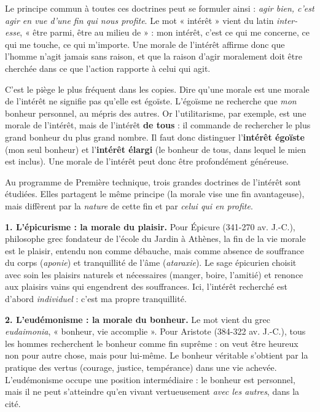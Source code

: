 \documentclass[11pt]{article}
\newcommand{\cle}[1]{{\popxbold\color{popdark}#1}}
\newcounter{popsec}
\newcounter{popsub}
\newcommand{\courssub}[1]{%
  \stepcounter{popsub}%
  \par\vspace{9pt}\noindent{\popxbold\fontsize{11.5}{13}\selectfont\color{popink}{\color{poporange}\thepopsec.\thepopsub}\hspace{6pt}#1}\par\nopagebreak\vspace{4pt}
}
\begin{document}
Le principe commun à toutes ces doctrines peut se formuler ainsi : \emph{agir bien, c'est agir en vue d'une fin qui nous profite}. Le mot « intérêt » vient du latin \emph{inter-esse}, « être parmi, être au milieu de » : mon intérêt, c'est ce qui me concerne, ce qui me touche, ce qui m'importe. Une morale de l'intérêt affirme donc que l'homme n'agit jamais sans raison, et que la raison d'agir moralement doit être cherchée dans ce que l'action rapporte à celui qui agit.

\begin{attention}
C'est le piège le plus fréquent dans les copies. Dire qu'une morale est une morale de l'\cle{intérêt} ne signifie pas qu'elle est \cle{égoïste}. L'égoïsme ne recherche que \emph{mon} bonheur personnel, au mépris des autres. Or l'utilitarisme, par exemple, est une morale de l'intérêt, mais de l'intérêt \textbf{de tous} : il commande de rechercher le plus grand bonheur du plus grand nombre. Il faut donc distinguer l'\textbf{intérêt égoïste} (mon seul bonheur) et l'\textbf{intérêt élargi} (le bonheur de tous, dans lequel le mien est inclus). Une morale de l'intérêt peut donc être profondément généreuse.
\end{attention}

\courssub{Les trois formes de la morale de l'intérêt}

Au programme de Première technique, trois grandes doctrines de l'intérêt sont étudiées. Elles partagent le même principe (la morale vise une fin avantageuse), mais diffèrent par la \emph{nature} de cette fin et par \emph{celui qui en profite}.

\textbf{1. L'épicurisme : la morale du plaisir.} Pour Épicure (341-270 av. J.-C.), philosophe grec fondateur de l'école du Jardin à Athènes, la fin de la vie morale est le \cle{plaisir}, entendu non comme débauche, mais comme absence de souffrance du corps (\emph{aponie}) et tranquillité de l'âme (\emph{ataraxie}). Le sage épicurien choisit avec soin les plaisirs naturels et nécessaires (manger, boire, l'amitié) et renonce aux plaisirs vains qui engendrent des souffrances. Ici, l'intérêt recherché est d'abord \emph{individuel} : c'est ma propre tranquillité.

\textbf{2. L'eudémonisme : la morale du bonheur.} Le mot vient du grec \emph{eudaimonia}, « bonheur, vie accomplie ». Pour Aristote (384-322 av. J.-C.), tous les hommes recherchent le \cle{bonheur} comme fin suprême : on veut être heureux non pour autre chose, mais pour lui-même. Le bonheur véritable s'obtient par la pratique des vertus (courage, justice, tempérance) dans une vie achevée. L'eudémonisme occupe une position intermédiaire : le bonheur est personnel, mais il ne peut s'atteindre qu'en vivant vertueusement \emph{avec les autres}, dans la cité.
\end{document}
